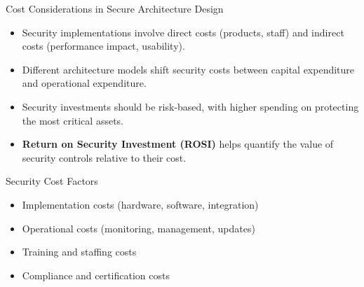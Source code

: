 \documentclass{beamer}
\begin{document}
    \begin{frame}{Cost Considerations in Secure Architecture Design}
        \begin{itemize}
        \item Security implementations involve direct costs (products, staff) and indirect costs (performance impact, usability).
        \item Different architecture models shift security costs between capital expenditure and operational expenditure.
        \item Security investments should be risk-based, with higher spending on protecting the most critical assets.
        \item \textbf{Return on Security Investment (ROSI)} helps quantify the value of security controls relative to their cost.
        \end{itemize}
        
        \begin{block}{Security Cost Factors}
        \begin{itemize}
        \item Implementation costs (hardware, software, integration)
        \item Operational costs (monitoring, management, updates)
        \item Training and staffing costs
        \item Compliance and certification costs
        \end{itemize}
        \end{block}
        \end{frame}
        
\end{document}

